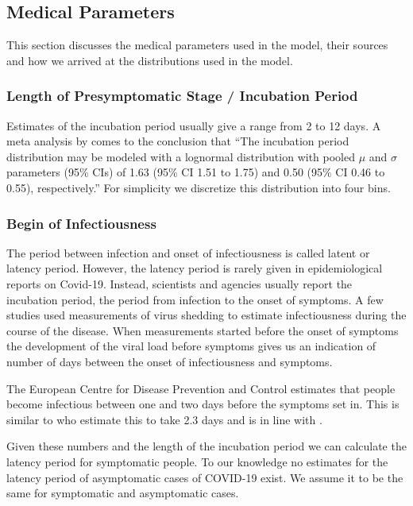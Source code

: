 \subsection{Medical Parameters}

This section discusses the medical parameters used in the model, their sources and how we arrived at the distributions used in the model.\footnotemark



\subsubsection{Length of Presymptomatic Stage / Incubation Period}


Estimates of the incubation period usually give a range from 2 to 12 days. A meta analysis by \citet{McAloon2020} comes to the conclusion that ``The incubation period distribution may be modeled with a lognormal distribution with pooled $\mu$ and $\sigma$ parameters (95\% CIs) of 1.63 (95\% CI 1.51 to 1.75) and 0.50 (95\% CI 0.46 to 0.55), respectively.'' For simplicity we discretize this distribution into four bins.


\subsubsection{Begin of Infectiousness}

The period between infection and onset of infectiousness is called latent or latency period. However, the latency period is rarely given in epidemiological reports on Covid-19. Instead, scientists and agencies usually report the incubation period, the period from infection to the onset of symptoms. A few studies used measurements of virus shedding to estimate infectiousness during the course of the disease. When measurements started before the onset of symptoms the development of the viral load before symptoms gives us an indication of number of days between the onset of infectiousness and symptoms.

The European Centre for Disease Prevention and Control estimates that people become infectious between one and two days before the symptoms set in. This is similar to \citet{He2020} who estimate this to take 2.3 days and is in line with \citet{Peak2020}.

Given these numbers and the length of the incubation period we can calculate the latency period for symptomatic people. To our knowledge no estimates for the latency period of asymptomatic cases of COVID-19 exist. We assume it to be the same for symptomatic and asymptomatic cases.

